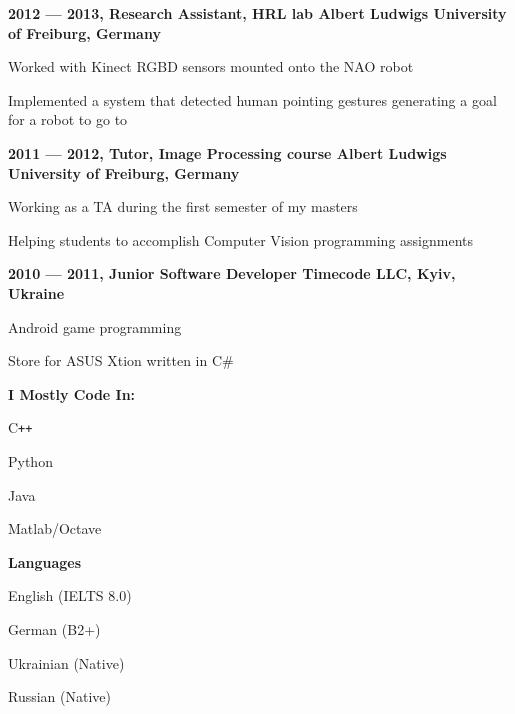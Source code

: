 \documentclass[a4paper,12pt,final]{memoir}
\newcommand{\Sep}{\vspace{1.5em}}
\newcommand{\SmallSep}{\vspace{0.5em}}
\newcommand{\CVSection}[1]
	{\Large\textbf{#1}\par
	\SmallSep\normalsize\normalfont}
\newcommand{\CVItem}[1]
	{\textbf{\color{MidnightBlue} #1}}
\begin{document}
\CVItem{2012 --- 2013, Research Assistant, HRL lab
\newline Albert Ludwigs University of Freiburg, Germany}
\begin{compactitem}[\color{RoyalBlue}$\circ$]
	\item Worked with Kinect RGBD sensors mounted onto the NAO robot
	\item Implemented a system that detected human pointing gestures generating a
	goal for a robot to go to
\end{compactitem}
\SmallSep

\CVItem{2011 --- 2012, Tutor, Image Processing course
\newline Albert Ludwigs University of Freiburg, Germany}
\begin{compactitem}[\color{RoyalBlue}$\circ$]
\item Working as a TA during the first semester of my masters
\item Helping students to accomplish Computer Vision programming assignments
\end{compactitem}
\SmallSep

\CVItem{2010 --- 2011, Junior Software Developer
\newline Timecode LLC, Kyiv, Ukraine}
\begin{compactitem}[\color{RoyalBlue}$\circ$]
\item Android game programming
\item Store for ASUS Xtion written in C\#
\end{compactitem}

\SmallSep
\framebreak
\clearpage
\framebreak{}
	\SmallSep{}
	\vspace{-2mm}

	\CVSection{I Mostly Code In:}
	\begin{compactitem}[\color{MidnightBlue}$\circ$]
		\item C\texttt{++}
		\item Python
		\item Java
		\item Matlab/Octave
	\end{compactitem}
	\Sep{}

	\CVSection{Languages}
	\begin{compactitem}[\color{MidnightBlue}$\circ$]
		\item English (IELTS 8.0)
		\item German (B2+)
		\item Ukrainian (Native)
		\item Russian (Native)
	\end{compactitem}
	\Sep{}
\end{document}
